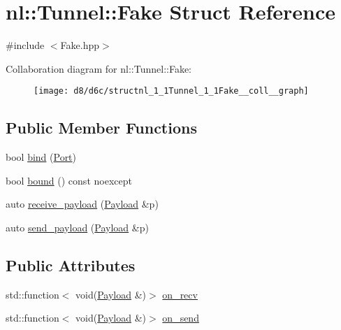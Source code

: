 \hypertarget{structnl_1_1Tunnel_1_1Fake}{}\section{nl\+:\+:Tunnel\+:\+:Fake Struct Reference}
\label{structnl_1_1Tunnel_1_1Fake}


{\ttfamily \#include $<$Fake.\+hpp$>$}



Collaboration diagram for nl\+:\+:Tunnel\+:\+:Fake\+:\nopagebreak
\begin{figure}[H]
\begin{center}
\leavevmode
\texttt{[image: d8/d6c/structnl\_1\_1Tunnel\_1\_1Fake\_\_coll\_\_graph]}
\end{center}
\end{figure}
\subsection*{Public Member Functions}
\begin{DoxyCompactItemize}
\item 
bool \hyperlink{structnl_1_1Tunnel_1_1Fake_ab74713cdd4029941a2a3fdc238b6c868}{bind} (\hyperlink{namespacenl_a12899c87e239db66809da0a71fcc9129}{Port})
\item 
bool \hyperlink{structnl_1_1Tunnel_1_1Fake_a7a209943b0e7959fa1527c7126f84e3c}{bound} () const  noexcept
\item 
auto \hyperlink{structnl_1_1Tunnel_1_1Fake_a139165e7ec18d3d1ff0f46f2bbcf2a4c}{receive\+\_\+payload} (\hyperlink{structnl_1_1Payload}{Payload} \&p)
\item 
auto \hyperlink{structnl_1_1Tunnel_1_1Fake_a399cae0a457bba33574504cedadf770d}{send\+\_\+payload} (\hyperlink{structnl_1_1Payload}{Payload} \&p)
\end{DoxyCompactItemize}
\subsection*{Public Attributes}
\begin{DoxyCompactItemize}
\item 
std\+::function$<$ void(\hyperlink{structnl_1_1Payload}{Payload} \&)$>$ \hyperlink{structnl_1_1Tunnel_1_1Fake_aa6e23820eac4afa94054d5324f8c45e5}{on\+\_\+recv}
\item 
std\+::function$<$ void(\hyperlink{structnl_1_1Payload}{Payload} \&)$>$ \hyperlink{structnl_1_1Tunnel_1_1Fake_a14e2c5c4defe795e40dece6ba04b8a7b}{on\+\_\+send}
\end{DoxyCompactItemize}


